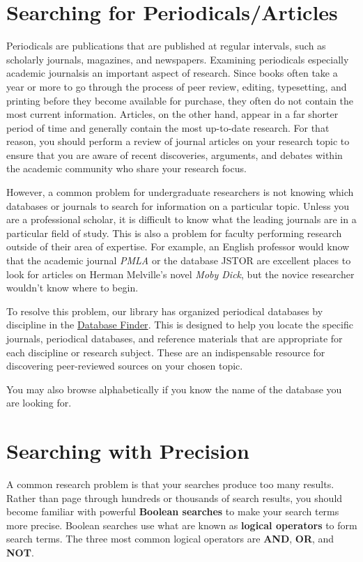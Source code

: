 \section{Searching for Periodicals/Articles}

Periodicals are publications that are published at regular intervals, such as
scholarly journals, magazines, and newspapers. Examining periodicals\textemdash
especially academic journals\textemdash is an important aspect of research.
Since books often take a year or more to go through the process of peer review,
editing, typesetting, and printing before they become available for purchase,
they often do not contain the most current information. Articles, on the other
hand, appear in a far shorter period of time and generally contain the most
up-to-date research. For that reason, you should perform a review of journal
articles on your research topic to ensure that you are aware of recent
discoveries, arguments, and debates within the academic community who share
your research focus.

However, a common problem for undergraduate researchers is not knowing which
databases or journals to search for information on a particular topic. Unless
you are a professional scholar, it is difficult to know what the leading
journals are in a particular field of study. This is also a problem for faculty performing research outside of their area of expertise. For example, an English professor would know that the academic journal \emph{PMLA} or the database JSTOR are excellent places to look for articles on Herman Melville's novel \emph{Moby
Dick}, but the novice researcher wouldn't know where to begin.

To resolve this problem, our library has organized periodical databases by
discipline in the \href{https://researchguides.dartmouth.edu/az.php}{Database
Finder}. This is designed to help you locate the specific journals, periodical
databases, and reference materials that are appropriate for each discipline or research subject.
These are an indispensable resource for discovering  peer-reviewed sources on
your chosen topic.

You may also browse alphabetically if you know the name of the database you are
looking for.

\section{Searching with Precision}

A common research problem is that your searches produce too many results.
Rather than page through hundreds or thousands of search results, you should
become familiar with powerful \textbf{Boolean searches} to make your search
terms more precise. Boolean searches use what are known as \textbf{logical
operators} to form search terms. The three most common logical operators are
\textbf{AND}, \textbf{OR}, and \textbf{NOT}.

